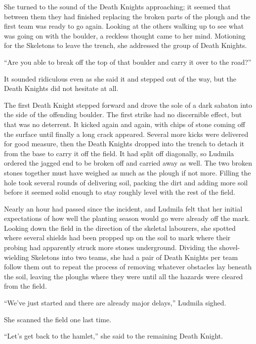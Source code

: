  

She turned to the sound of the Death Knights approaching; it seemed that between them they had finished replacing the broken parts of the plough and the first team was ready to go again. Looking at the others walking up to see what was going on with the boulder, a reckless thought came to her mind. Motioning for the Skeletons to leave the trench, she addressed the group of Death Knights.

 

“Are you able to break off the top of that boulder and carry it over to the road?”

 

It sounded ridiculous even as she said it and stepped out of the way, but the Death Knights did not hesitate at all.

 

The first Death Knight stepped forward and drove the sole of a dark sabaton into the side of the offending boulder. The first strike had no discernible effect, but that was no deterrent. It kicked again and again, with chips of stone coming off the surface until finally a long crack appeared. Several more kicks were delivered for good measure, then the Death Knights dropped into the trench to detach it from the base to carry it off the field. It had split off diagonally, so Ludmila ordered the jagged end to be broken off and carried away as well. The two broken stones together must have weighed as much as the plough if not more. Filling the hole took several rounds of delivering soil, packing the dirt and adding more soil before it seemed solid enough to stay roughly level with the rest of the field.

 

Nearly an hour had passed since the incident, and Ludmila felt that her initial expectations of how well the planting season would go were already off the mark. Looking down the field in the direction of the skeletal labourers, she spotted where several shields had been propped up on the soil to mark where their probing had apparently struck more stones underground. Dividing the shovel-wielding Skeletons into two teams, she had a pair of Death Knights per team follow them out to repeat the process of removing whatever obstacles lay beneath the soil, leaving the ploughs where they were until all the hazards were cleared from the field.

 

“We’ve just started and there are already major delays,” Ludmila sighed.

 

She scanned the field one last time.

 

“Let’s get back to the hamlet,” she said to the remaining Death Knight.